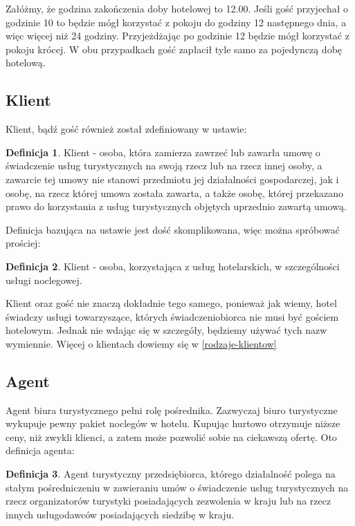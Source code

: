 \documentclass[a4paper,onecolumn,oneside,11pt,wide,floatssmall]{mwrep}
\theoremstyle{definition}
\newtheorem{defn}{Definicja}[section]
\theoremstyle{plain}%
\theoremstyle{remark}
\begin{document}
Załóżmy, że godzina zakończenia doby hotelowej to 12.00. Jeśli gość 
przyjechał o godzinie 10 to będzie mógł korzystać z pokoju do godziny 12 
następnego dnia, a więc więcej niż 24 godziny. Przyjeżdżając po godzinie 12 
będzie mógł korzystać z pokoju krócej. W obu przypadkach gość zapłacił tyle 
samo za pojedynczą dobę hotelową.


\subsection{Klient}

Klient, bądź gość również został zdefiniowany w ustawie\cite{ust:tur}:

\begin{defn}{Klient}
- osoba, która zamierza zawrzeć lub zawarła umowę o świadczenie usług 
turystycznych na swoją rzecz lub na rzecz innej osoby, a zawarcie tej umowy 
nie stanowi przedmiotu jej działalności gospodarczej, jak i osobę, na rzecz 
której umowa została zawarta, a także osobę, której przekazano prawo do 
korzystania z usług turystycznych objętych uprzednio zawartą umową.

\end{defn}

Definicja bazująca na ustawie jest dość skomplikowana, więc można spróbować 
prościej:

\begin{defn}{Klient}
- osoba, korzystająca z usług hotelarskich, w szczególności usługi noclegowej.

\end{defn}

Klient oraz gość nie znaczą dokładnie tego samego, ponieważ jak wiemy, 
hotel świadczy usługi towarzyszące, których świadczeniobiorca nie musi być gościem hotelowym. Jednak nie wdając się w szczegóły, 
będziemy używać tych nazw wymiennie. Więcej o klientach dowiemy się w 
\ref{rodzaje-klientow}

\subsection{Agent}
Agent biura turystycznego pełni rolę pośrednika. Zazwyczaj biuro turystyczne 
wykupuje pewny pakiet noclegów w hotelu. Kupując hurtowo otrzymuje niższe 
ceny, niż zwykli klienci, a zatem może pozwolić sobie na ciekawszą ofertę. 
Oto definicja agenta\cite{ust:tur}:

\begin{defn}{Agent turystyczny}
przedsiębiorca, którego działalność polega na stałym pośredniczeniu w 
zawieraniu umów o świadczenie usług turystycznych na rzecz organizatorów 
turystyki posiadających zezwolenia w kraju lub na rzecz innych usługodawców 
posiadających siedzibę w kraju.
\end{defn}
\end{document}

